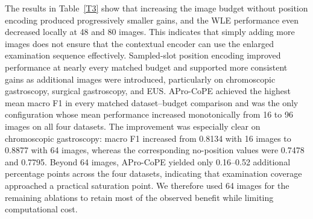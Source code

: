 \documentclass[Afour,sagev,times]{sagej}
\begin{document}
The results in Table~\ref{T3} show that increasing the image budget without position encoding produced progressively smaller gains, and the WLE performance even decreased locally at 48 and 80 images. This indicates that simply adding more images does not ensure that the contextual encoder can use the enlarged examination sequence effectively. Sampled-slot position encoding improved performance at nearly every matched budget and supported more consistent gains as additional images were introduced, particularly on chromoscopic gastroscopy, surgical gastroscopy, and EUS. APro-CoPE achieved the highest mean macro F1 in every matched dataset--budget comparison and was the only configuration whose mean performance increased monotonically from 16 to 96 images on all four datasets. The improvement was especially clear on chromoscopic gastroscopy: macro F1 increased from 0.8134 with 16 images to 0.8877 with 64 images, whereas the corresponding no-position values were 0.7478 and 0.7795. Beyond 64 images, APro-CoPE yielded only 0.16--0.52 additional percentage points across the four datasets, indicating that examination coverage approached a practical saturation point. We therefore used 64 images for the remaining ablations to retain most of the observed benefit while limiting computational cost.
\end{document}
